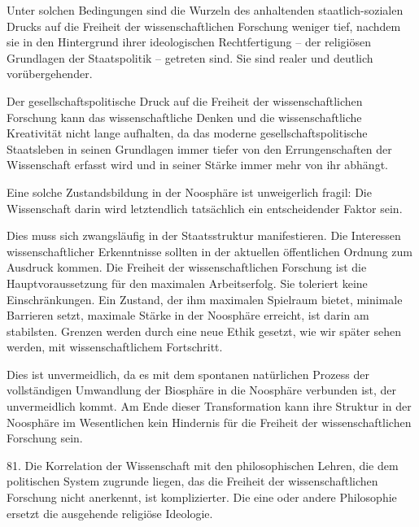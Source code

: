 \documentclass[11pt,a4paper]{book}
\begin{document}
Unter solchen Bedingungen sind die Wurzeln des anhaltenden staatlich-sozialen Drucks auf die Freiheit der wissenschaftlichen Forschung weniger tief, nachdem sie in den Hintergrund ihrer ideologischen Rechtfertigung -- der religiösen Grundlagen der Staatspolitik -- getreten sind. Sie sind realer und deutlich vorübergehender.



Der gesellschaftspolitische Druck auf die Freiheit der wissenschaftlichen Forschung kann das wissenschaftliche Denken und die wissenschaftliche Kreativität nicht lange aufhalten, da das moderne gesellschaftspolitische Staatsleben in seinen Grundlagen immer tiefer von den Errungenschaften der Wissenschaft erfasst wird und in seiner Stärke immer mehr von ihr abhängt.



Eine solche Zustandsbildung in der Noosphäre ist unweigerlich fragil: Die Wissenschaft darin wird letztendlich tatsächlich ein entscheidender Faktor sein.



Dies muss sich zwangsläufig in der Staatsstruktur manifestieren. Die Interessen wissenschaftlicher Erkenntnisse sollten in der aktuellen öffentlichen Ordnung zum Ausdruck kommen. Die Freiheit der wissenschaftlichen Forschung ist die Hauptvoraussetzung für den maximalen Arbeitserfolg. Sie toleriert keine Einschränkungen. Ein Zustand, der ihm maximalen Spielraum bietet, minimale Barrieren setzt, maximale Stärke in der Noosphäre erreicht, ist darin am stabilsten. Grenzen werden durch eine neue Ethik gesetzt, wie wir später sehen werden, mit wissenschaftlichem Fortschritt.



Dies ist unvermeidlich, da es mit dem spontanen natürlichen Prozess der vollständigen Umwandlung der Biosphäre in die Noosphäre verbunden ist, der unvermeidlich kommt. Am Ende dieser Transformation kann ihre Struktur in der Noosphäre im Wesentlichen kein Hindernis für die Freiheit der wissenschaftlichen Forschung sein.



81. Die Korrelation der Wissenschaft mit den philosophischen Lehren, die dem politischen System zugrunde liegen, das die Freiheit der wissenschaftlichen Forschung nicht anerkennt, ist komplizierter. Die eine oder andere Philosophie ersetzt die ausgehende religiöse Ideologie.
\end{document}
